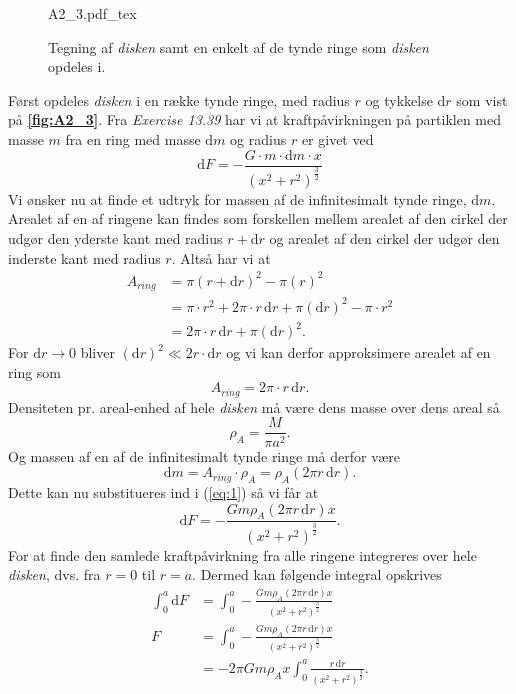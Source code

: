 \documentclass[12pt]{article}
\newcommand{\incfig}[2][1]{%
  \def\svgwidth{#1\columnwidth}
  {#2.pdf_tex}
}
\theoremstyle{definition}
\begin{document}
\bigbreak

\begin{figure}[ht]
  \centering
  \incfig[0.4]{A2_3}
  \caption{Tegning af \textit{disken} samt en enkelt af de tynde ringe som \textit{disken} opdeles i.}
  \label{fig:A2_3}
\end{figure}

Først opdeles \textit{disken} i en række tynde ringe, med radius $r$ og tykkelse $\mathrm{d}r$ som vist på \textbf{\autoref{fig:A2_3}}. Fra \textit{Exercise 13.39} har vi at kraftpåvirkningen på partiklen med masse $m$ fra en ring med masse $\mathrm{d}m$ og radius $r$ er givet ved
\begin{equation} \label{eq:1}
    \mathrm{d}F = - \frac{G \cdot m \cdot \mathrm{d}m \cdot x}{\left( x^2 + r^2 \right)^{\frac{3}{2}}}
\end{equation}
Vi ønsker nu at finde et udtryk for massen af de infinitesimalt tynde ringe, $\mathrm{d}m$. Arealet af en af ringene kan findes som forskellen mellem arealet af den cirkel der udgør den yderste kant med radius $r + \mathrm{d}r$ og arealet af den cirkel der udgør den inderste kant med radius $r$. Altså har vi at
\begin{align*}
  A_{ring} &= \pi(r + \mathrm{d}r)^2 - \pi(r)^2 \\
           &= \pi \cdot r^2 + 2 \pi \cdot r \, \mathrm{d}r + \pi(\mathrm{d}r)^2 - \pi \cdot r^2 \\
           &= 2\pi \cdot r \, \mathrm{d}r + \pi(\mathrm{d}r)^2
.\end{align*}
For $\mathrm{d}r \to 0$ bliver $(\mathrm{d}r)^2 \ll 2r \cdot \mathrm{d}r$ og vi kan derfor approksimere arealet af en ring som
\[ 
A_{ring} = 2\pi \cdot r \, \mathrm{d}r
.\]
Densiteten pr. areal-enhed af hele \textit{disken} må være dens masse over dens areal så
\[ 
\rho_A = \frac{M}{\pi a^2}
.\]
Og massen af en af de infinitesimalt tynde ringe må derfor være
\[ 
  \mathrm{d}m = A_{ring} \cdot \rho_A = \rho_A(2\pi r \, \mathrm{d}r)
.\]
Dette kan nu substitueres ind i (\ref{eq:1}) så vi får at
\[ 
  \mathrm{d}F = - \frac{Gm\rho_A(2\pi r \, \mathrm{d}r)x}{\left( x^2 + r^2 \right)^{\frac{3}{2}}}
.\]
For at finde den samlede kraftpåvirkning fra alle ringene integreres over hele \textit{disken}, dvs. fra $r = 0$ til $r = a$. Dermed kan følgende integral opskrives
\begin{align*}
  \int_{0}^{a} \mathrm{d}F &= \int_{0}^{a} - \frac{Gm\rho_A(2\pi r \, \mathrm{d}r)x}{\left( x^2 + r^2 \right)^{\frac{3}{2}}} \\
  F &= \int_{0}^{a} - \frac{Gm\rho_A(2\pi r \, \mathrm{d}r)x}{\left( x^2 + r^2 \right)^{\frac{3}{2}}} \\
  &= -2\pi G m \rho_A x \int_{0}^{a} \frac{r \, \mathrm{d}r}{\left( x^2 + r^2 \right)^{\frac{3}{2}}}
.\end{align*}
\end{document}
